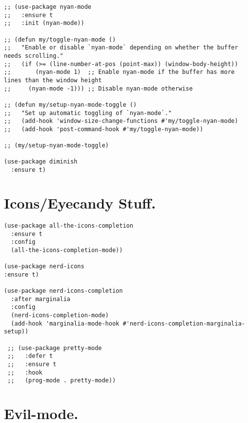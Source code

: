 \documentclass[11pt]{article}
\begin{document}
\begin{verbatim}
;; (use-package nyan-mode
;;   :ensure t
;;   :init (nyan-mode))

;; (defun my/toggle-nyan-mode ()
;;   "Enable or disable `nyan-mode` depending on whether the buffer needs scrolling."
;;   (if (>= (line-number-at-pos (point-max)) (window-body-height))
;;       (nyan-mode 1)  ;; Enable nyan-mode if the buffer has more lines than the window height
;;     (nyan-mode -1))) ;; Disable nyan-mode otherwise

;; (defun my/setup-nyan-mode-toggle ()
;;   "Set up automatic toggling of `nyan-mode`."
;;   (add-hook 'window-size-change-functions #'my/toggle-nyan-mode)
;;   (add-hook 'post-command-hook #'my/toggle-nyan-mode))

;; (my/setup-nyan-mode-toggle)

(use-package diminish
  :ensure t)
\end{verbatim}
\section{Icons/Eyecandy Stuff.}
\label{sec:org48f8bdf}
\begin{verbatim}
(use-package all-the-icons-completion
  :ensure t
  :config
  (all-the-icons-completion-mode))

(use-package nerd-icons
:ensure t)

(use-package nerd-icons-completion
  :after marginalia
  :config
  (nerd-icons-completion-mode)
  (add-hook 'marginalia-mode-hook #'nerd-icons-completion-marginalia-setup))

 ;; (use-package pretty-mode
 ;;   :defer t 
 ;;   :ensure t
 ;;   :hook
 ;;   (prog-mode . pretty-mode))
\end{verbatim}
\section{Evil-mode.}
\label{sec:orgeba4dad}
\end{document}
